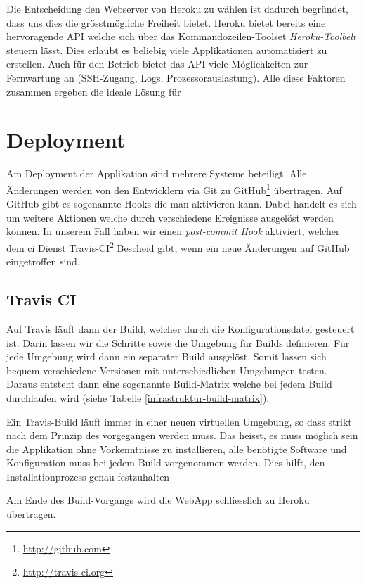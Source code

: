 Die Entscheidung den Webserver von Heroku zu wählen ist dadurch begründet, dass uns dies die grösstmögliche Freiheit bietet. 
Heroku bietet bereits eine hervoragende \gls{API} welche sich über das Kommandozeilen-Toolset \emph{Heroku-Toolbelt} steuern lässt.
Dies erlaubt es beliebig viele Applikationen automatisiert zu erstellen.
Auch für den Betrieb bietet das API viele Möglichkeiten zur Fernwartung an (SSH-Zugang, Logs, Prozessorauslastung).
Alle diese Faktoren zusammen ergeben die ideale Lösung für 

\section{Deployment}
Am Deployment der Applikation sind mehrere Systeme beteiligt. 
Alle Änderungen werden von den Entwicklern via \gls{Git} zu GitHub\footnote{\url{http://github.com}} übertragen. 
Auf GitHub gibt es sogenannte Hooks die man aktivieren kann. 
Dabei handelt es sich um weitere Aktionen welche durch verschiedene Ereignisse ausgelöst werden können. 
In unserem Fall haben wir einen \emph{post-commit Hook} aktiviert, welcher dem \gls{ci} Dienst Travis-CI\footnote{\url{http://travis-ci.org}} Bescheid gibt, wenn ein neue Änderungen auf GitHub eingetroffen sind.

\subsection{Travis CI}
Auf Travis läuft dann der Build, welcher durch die Konfigurationsdatei  gesteuert ist. Darin lassen wir die Schritte sowie die Umgebung für Builds definieren. Für jede Umgebung wird dann ein separater Build ausgelöst. Somit lassen sich bequem verschiedene Versionen mit unterschiedlichen Umgebungen testen.
Daraus entsteht dann eine sogenannte Build-Matrix welche bei jedem Build durchlaufen wird (siehe Tabelle \ref{infrastruktur-build-matrix}).

Ein Travis-Build läuft immer in einer neuen virtuellen Umgebung, so dass strikt nach dem Prinzip des \emph{} vorgegangen werden muss. Das heisst, es muss möglich sein die Applikation ohne Vorkenntnisse zu installieren, alle benötigte Software und Konfiguration muss bei jedem Build vorgenommen werden.
Dies hilft, den Installationprozess genau festzuhalten

Am Ende des Build-Vorgangs wird die \gls{WebApp} schliesslich zu Heroku übertragen. 

